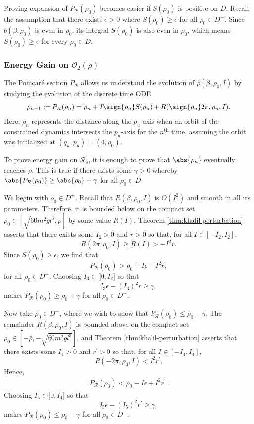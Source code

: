 Proving expansion of \(P_\mathcal{R}(\rho_0)\) becomes easier if
\(S(\rho_0)\) is positive on \(D\).
Recall the assumption that there exists
\(\epsilon > 0\) where \(S(\rho_0) \geq \epsilon\) for all 
\(\rho_0 \in D^+\).
Since \(b(\beta,\rho_0)\) is even in \(\rho_0\),
its integral \(S(\rho_0)\) is also even in \(\rho_0\),
which means \(S(\rho_0) \geq \epsilon\) for every \(\rho_0 \in D\).

\subsubsection*{Energy Gain on \(\mathcal{O}_2(\bar{\rho})\)}
The Poincar\'{e} section \(P_\mathcal{R}\) allows us understand the evolution of
\(\hat{\rho}(\beta,\rho_0,I)\) by studying the evolution of the discrete time
ODE
\begin{equation}\label{eqn:rhohat-discrete}
    \rho_{n+1} := P_\mathcal{R}(\rho_n) 
    = \rho_n + I\sign{\rho_n}S(\rho_n) + 
        R(\sign{\rho_n}2\pi,\rho_n,I)
    .
\end{equation}
Here, \(\rho_n\) represents the distance along the
\(p_u\)-axis when an orbit of the constrained dynamics intersects the
\(p_u\)-axis for the \(n^\text{th}\) time, assuming the orbit was initialized at
\((q_u,p_u) = (0,\rho_0)\).

To prove energy gain on \(\mathcal{R}_{\bar{\rho}}\), it is
enough to prove that \(\abs{\rho_n}\) eventually reaches \(\bar{\rho}\).
This is true if there exists some \(\gamma > 0\)
whereby \(\abs{P_\mathcal{R}(\rho_0)} \geq \abs{\rho_0} + \gamma\) for all 
\(\rho_0 \in D\)

We begin with \(\rho_0 \in D^+\).
Recall that \(R(\beta,\rho_0,I)\) is \(O(I^2)\) and smooth in all
its parameters.
Therefore, it is bounded below on the compact set
\(\rho_0 \in \left[\sqrt{60m^2gl^3},\bar{\rho}\right]\) by some value
\(\underbar{R}(I)\).
Theorem \ref{thm:khalil-perturbation} asserts that there exists some 
\(I_2 > 0\) and \(r > 0\) so that, for all \(I \in [-I_2,I_2]\),
\[
    R(2\pi,\rho_0,I) \geq \underbar{R}(I) > -I^2r
    .
\]
Since \(S(\rho_0) \geq \epsilon\), we find that
\[
    P_\mathcal{R}(\rho_0) > \rho_0 + I\epsilon -I^2r
    ,
\]
for all \(\rho_0 \in D^+\).
Choosing \(I_3 \in \,]0,I_2]\) so that
\[
    I_3\epsilon - (I_3)^2 r \geq \gamma
    ,
\] 
makes \(P_\mathcal{R}(\rho_0) \geq \rho_0 + \gamma\) for all 
\(\rho_0 \in D^+\).

Now take \(\rho_0 \in D^-\), where we wish to show that 
\(P_\mathcal{R}(\rho_0) \leq \rho_0 - \gamma\).
The remainder \(R(\beta,\rho_0,I)\) is bounded above on the compact set 
\(\rho_0 \in \left[-\bar{\rho},-\sqrt{60m^2gl^3}\right]\), and 
Theorem \ref{thm:khalil-perturbation} asserts that there exists some 
\(I_4 > 0\) and \(r^\prime > 0\) so that, for all \(I \in [-I_4,I_4]\), 
\[
    R(-2\pi,\rho_0,I) < I^2 r^\prime
    .
\]
Hence,
\begin{align*}
    P_\mathcal{R}(\rho_0) < \rho_0 - I\epsilon + I^2r^\prime
    .
\end{align*}
Choosing \(I_5 \in ]0,I_4]\) so that 
\[
    I_5 \epsilon - (I_5)^2r^\prime \geq \gamma
    ,
\] 
makes \(P_\mathcal{R}(\rho_0) \leq \rho_0 - \gamma\) for all 
\(\rho_0 \in D^-\).

